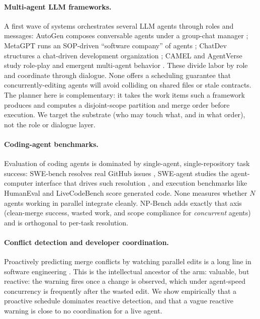 \paragraph{Multi-agent LLM frameworks.} A first wave of systems orchestrates several LLM agents
through roles and messages: AutoGen composes conversable agents under a group-chat manager
\citep{wu2023autogen}; MetaGPT runs an SOP-driven ``software company'' of agents
\citep{hong2024metagpt}; ChatDev structures a chat-driven development organization
\citep{qian2024chatdev}; CAMEL and AgentVerse study role-play and emergent multi-agent behavior
\citep{li2023camel,chen2023agentverse}. These divide labor by role and coordinate through dialogue.
None offers a scheduling guarantee that concurrently-editing agents will avoid colliding on shared
files or stale contracts. The planner here is complementary: it takes the work items such a
framework produces and computes a disjoint-scope partition and merge order before execution. We
target the substrate (who may touch what, and in what order), not the role or dialogue layer.

\paragraph{Coding-agent benchmarks.} Evaluation of coding agents is dominated by single-agent,
single-repository task success: SWE-bench resolves real GitHub issues \citep{jimenez2024swebench},
SWE-agent studies the agent-computer interface that drives such resolution
\citep{yang2024sweagent}, and execution benchmarks like HumanEval \citep{chen2021codex} and
LiveCodeBench \citep{jain2024livecodebench} score generated code. None measures whether $N$ agents
working in parallel integrate cleanly. NP-Bench adds exactly that axis (clean-merge success,
wasted work, and scope compliance for \emph{concurrent} agents) and is orthogonal to per-task
resolution.

\paragraph{Conflict detection and developer coordination.} Proactively predicting merge conflicts
by watching parallel edits is a long line in software engineering
\citep{brun2011proactive}. This is the intellectual ancestor of the  arm: valuable,
but reactive: the warning fires once a change is observed, which under agent-speed concurrency is
frequently after the wasted edit. We show empirically that a proactive schedule dominates reactive
detection, and that a vague reactive warning is close to no coordination for a live agent.

